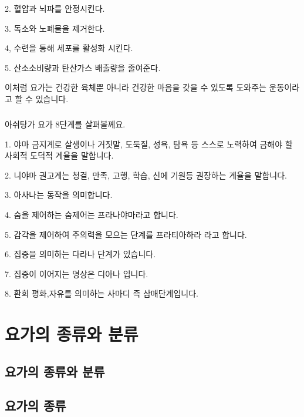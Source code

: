 \documentclass[12pt, a4paper, oneside]{book}
\let\stdsection\section
\renewcommand\section{\newpage\stdsection}
\begin{document}
2. 혈압과 뇌파를 안정시킨다.

3. 독소와 노폐물을 제거한다.

4, 수련을 통해 세포를 활성화 시킨다.

5. 산소소비량과 탄산가스 배출량을 줄여준다.



이처럼 요가는 건강한 육체뿐 아니라 건강한 마음을 갖을 수 있도록 도와주는 운동이라고 할 수 있습니다.



\paragraph{}아쉬탕가 요가 8단계를 살펴볼께요.

1. 야마 금지계로 살생이나 거짓말, 도둑질, 성욕, 탐욕 등 스스로 노력하여 금해야 할 사회적 도덕적 계율을 말합니다.

2. 니야마 권고계는 청결, 만족, 고행, 학습, 신에 기원등 권장하는 계율을 말합니다.

3. 아사나는 동작을 의미합니다.

4. 숨을 제어하는 숨제어는 프라나야마라고 합니다.

5. 감각을 제어하여 주의력을 모으는 단계를 프라티아하라 라고 합니다.

6. 집중을 의미하는 다라나 단계가 있습니다. 

7. 집중이 이어지는 명상은 디아나 입니다.

8. 환희 평화,자유를 의미하는 사마디 즉 삼매단계입니다.





	\chapter{요가의 종류와 분류}
	\minitoc

%
%
%
\newpage
\section{요가의 종류와 분류}



\section{요가의 종류}
\end{document}
